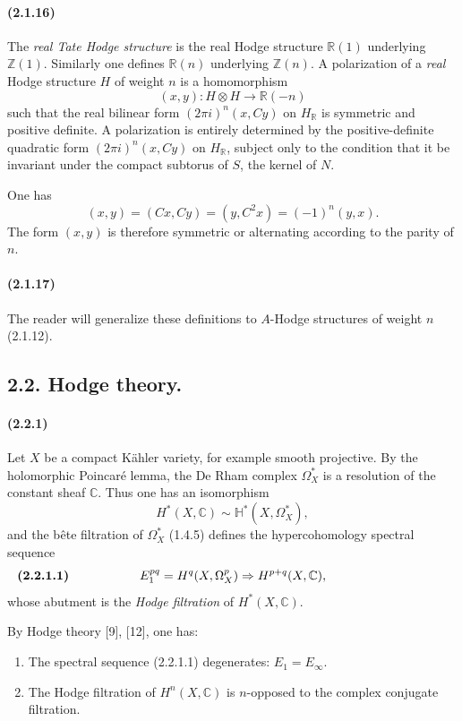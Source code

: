 \documentclass[10pt]{article}
\newcommand{\C}{\mathbb C}
\newcommand{\Z}{\mathbb Z}
\newcommand{\R}{\mathbb R}
\begin{document}
\paragraph{(2.1.16)} The \emph{real Tate Hodge structure} is the real Hodge structure $\R(1)$ underlying $\Z(1)$. Similarly one defines $\R(n)$ underlying $\Z(n)$. A polarization of a \emph{real} Hodge structure $H$ of weight $n$ is a homomorphism
\[
(x,y):H\otimes H\longrightarrow\R(-n)
\]
such that the real bilinear form $(2\pi i)^n(x,Cy)$ on $H_\R$ is symmetric and positive definite. A polarization is entirely determined by the positive-definite quadratic form $(2\pi i)^n(x,Cy)$ on $H_\R$, subject only to the condition that it be invariant under the compact subtorus of $S$, the kernel of $N$.

One has
\[
(x,y)=(Cx,Cy)=(y,C^2x)=(-1)^n(y,x).
\]
The form $(x,y)$ is therefore symmetric or alternating according to the parity of $n$.

\paragraph{(2.1.17)} The reader will generalize these definitions to $A$-Hodge structures of weight $n$ (2.1.12).

\subsection*{2.2. Hodge theory.}

\paragraph{(2.2.1)} Let $X$ be a compact Kähler variety, for example smooth projective. By the holomorphic Poincaré lemma, the De Rham complex $\Omega_X^*$ is a resolution of the constant sheaf $\C$. Thus one has an isomorphism
\[
H^*(X,\C)\sim\mathbb H^*(X,\Omega_X^*),
\]
and the bête filtration of $\Omega_X^*$ (1.4.5) defines the hypercohomology spectral sequence
\[
\makebox[\textwidth][s]{\textbf{(2.2.1.1)}\hfill$\displaystyle E_1^{pq}=H^q(X,\Omega_X^p)\Rightarrow H^{p+q}(X,\C),$\hfill\phantom{\textbf{(2.2.1.1)}}}
\]
whose abutment is the \emph{Hodge filtration} of $H^*(X,\C)$.

By Hodge theory [9], [12], one has:
\begin{enumerate}[label=(\Alph*)]
\item The spectral sequence (2.2.1.1) degenerates: $E_1=E_\infty$.
\item The Hodge filtration of $H^n(X,\C)$ is $n$-opposed to the complex conjugate filtration.
\end{enumerate}
\end{document}
